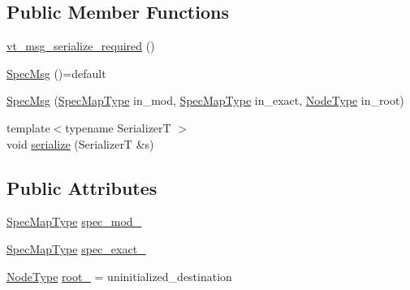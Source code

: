 \subsection*{Public Member Functions}
\begin{DoxyCompactItemize}
\item 
\hyperlink{structvt_1_1trace_1_1file__spec_1_1_trace_spec_1_1_spec_msg_aca2e03cf30d8f3da33ba9d1e04f3c36a}{vt\+\_\+msg\+\_\+serialize\+\_\+required} ()
\item 
\hyperlink{structvt_1_1trace_1_1file__spec_1_1_trace_spec_1_1_spec_msg_a3abe17303571fb68cc68f6ffc61d3cf2}{Spec\+Msg} ()=default
\item 
\hyperlink{structvt_1_1trace_1_1file__spec_1_1_trace_spec_1_1_spec_msg_a9d3b85c6410cdb3eee1c3a1e4077a2a8}{Spec\+Msg} (\hyperlink{structvt_1_1trace_1_1file__spec_1_1_trace_spec_a155d6b881e8d69a4644823789788ce5c}{Spec\+Map\+Type} in\+\_\+mod, \hyperlink{structvt_1_1trace_1_1file__spec_1_1_trace_spec_a155d6b881e8d69a4644823789788ce5c}{Spec\+Map\+Type} in\+\_\+exact, \hyperlink{namespacevt_a866da9d0efc19c0a1ce79e9e492f47e2}{Node\+Type} in\+\_\+root)
\item 
{\footnotesize template$<$typename SerializerT $>$ }\\void \hyperlink{structvt_1_1trace_1_1file__spec_1_1_trace_spec_1_1_spec_msg_ac4f0c665296df48a027f4f662092bb70}{serialize} (SerializerT \&s)
\end{DoxyCompactItemize}
\subsection*{Public Attributes}
\begin{DoxyCompactItemize}
\item 
\hyperlink{structvt_1_1trace_1_1file__spec_1_1_trace_spec_a155d6b881e8d69a4644823789788ce5c}{Spec\+Map\+Type} \hyperlink{structvt_1_1trace_1_1file__spec_1_1_trace_spec_1_1_spec_msg_a6857f603118b595c04ce28caf1ffb779}{spec\+\_\+mod\+\_\+}
\item 
\hyperlink{structvt_1_1trace_1_1file__spec_1_1_trace_spec_a155d6b881e8d69a4644823789788ce5c}{Spec\+Map\+Type} \hyperlink{structvt_1_1trace_1_1file__spec_1_1_trace_spec_1_1_spec_msg_a9429b0c5d1d8377bd4bee3d85d0c2456}{spec\+\_\+exact\+\_\+}
\item 
\hyperlink{namespacevt_a866da9d0efc19c0a1ce79e9e492f47e2}{Node\+Type} \hyperlink{structvt_1_1trace_1_1file__spec_1_1_trace_spec_1_1_spec_msg_af08fc9b92f2d6d926a543a339332e4dd}{root\+\_\+} = uninitialized\+\_\+destination
\end{DoxyCompactItemize}
